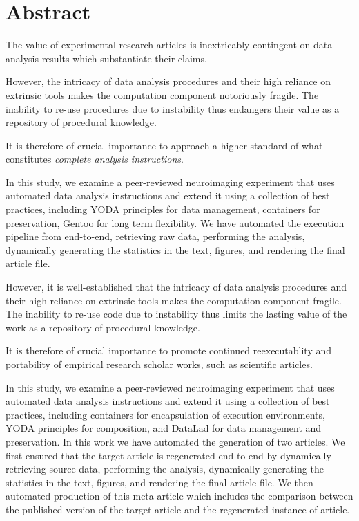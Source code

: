 \section{Abstract}

The value of experimental research articles is inextricably contingent on data analysis results which substantiate their claims.

However, the intricacy of data analysis procedures and their high reliance on extrinsic tools makes the computation component notoriously fragile.
The inability to re-use procedures due to instability thus endangers their value as a repository of procedural knowledge.

It is therefore of crucial importance to approach a higher standard of what constitutes \textit{complete analysis instructions}.

In this study, we examine a peer-reviewed neuroimaging experiment that uses automated data analysis instructions and extend it using a collection of best practices, including YODA principles for data management, containers for preservation, Gentoo for long term flexibility.
We have automated the execution pipeline from end-to-end, retrieving raw data, performing the analysis, dynamically generating the statistics in the text, figures, and rendering the final article file.


However, it is well-established that the intricacy of data analysis procedures and their high reliance on extrinsic tools makes the computation component fragile.
The inability to re-use code due to instability thus limits the lasting value of the work as a repository of procedural knowledge.

It is therefore of crucial importance to promote continued reexecutablity and portability of empirical research scholar works, such as scientific articles.

In this study, we examine a peer-reviewed neuroimaging experiment that uses automated data analysis instructions and extend it using a collection of best practices, including containers for encapsulation of execution environments, YODA principles for composition, and DataLad for data management and preservation.
In this work we have automated the generation of two articles.
We first ensured that the target article is regenerated end-to-end by dynamically retrieving source data, performing the analysis, dynamically generating the statistics in the text, figures, and rendering the final article file.
We then automated production of this meta-article which includes the comparison between the published version of the target article and the regenerated instance of article.


